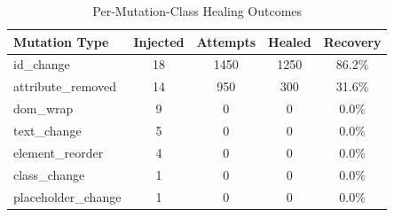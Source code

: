 \begin{table}[h]
\centering
\caption{Per-Mutation-Class Healing Outcomes}
\label{tab:mutation_failure_impact}
\begin{tabular}{lcccc}
\toprule
Mutation Type & Injected & Attempts & Healed & Recovery \\
\midrule
id\_change & 18 & 1450 & 1250 & 86.2\% \\
attribute\_removed & 14 & 950 & 300 & 31.6\% \\
dom\_wrap & 9 & 0 & 0 & 0.0\% \\
text\_change & 5 & 0 & 0 & 0.0\% \\
element\_reorder & 4 & 0 & 0 & 0.0\% \\
class\_change & 1 & 0 & 0 & 0.0\% \\
placeholder\_change & 1 & 0 & 0 & 0.0\% \\
\bottomrule
\end{tabular}
\end{table}